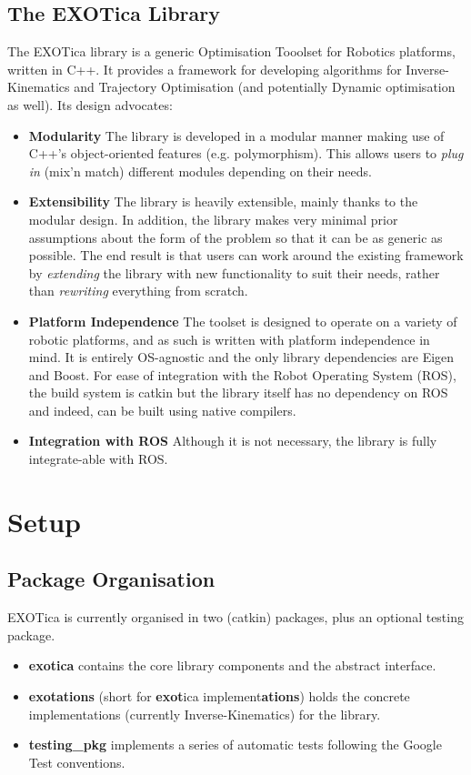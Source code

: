 \documentclass[12pt,a4paper,onecolumn]{article}
\begin{document}
\subsection{The EXOTica Library}
The EXOTica library is a generic Optimisation Tooolset for Robotics platforms, written in C++. It provides a framework for developing algorithms for Inverse-Kinematics and Trajectory Optimisation (and potentially Dynamic optimisation as well). Its design advocates:
\begin{itemize}
\item \textbf{Modularity} The library is developed in a modular manner making use of C++'s object-oriented features (e.g. polymorphism). This allows users to \textit{plug in} (mix'n match) different modules depending on their needs.
\item \textbf{Extensibility} The library is heavily extensible, mainly thanks to the modular design. In addition, the library makes very minimal prior assumptions about the form of the problem so that it can be as generic as possible. The end result is that users can work around the existing framework by \textit{extending} the library with new functionality to suit their needs, rather than \textit{rewriting} everything from scratch.
\item \textbf{Platform Independence} The toolset is designed to operate on a variety of robotic platforms, and as such is written with platform independence in mind. It is entirely OS-agnostic and the only library dependencies are Eigen and Boost. For ease of integration with the Robot Operating System (ROS), the build system is catkin but the library itself has no dependency on ROS and indeed, can be built using native compilers.
\item \textbf{Integration with ROS} Although it is not necessary, the library is fully integrate-able with ROS.
\end{itemize}

\newpage
\section{Setup}
\label{SETUP}

\subsection{Package Organisation}
EXOTica is currently organised in two (catkin) packages, plus an optional testing package.
\begin{itemize}
\item \textbf{exotica} contains the core library components and the abstract interface.
\item \textbf{exotations} (short for \textbf{exot}ica implement\textbf{ations}) holds the concrete implementations (currently Inverse-Kinematics) for the library.
\item \textbf{testing\_pkg} implements a series of automatic tests following the Google Test conventions.
\end{itemize}
\end{document}
